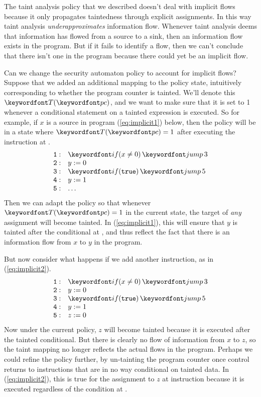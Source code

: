 \documentclass[11pt,twoside]{scrartcl}
\begin{document}
The taint analysis policy that we described doesn't deal with implicit flows because it only propagates taintedness through explicit assignments. In this way taint analysis \emph{underapproximates} information flow. Whenever taint analysis deems that information has flowed from a source to a sink, then an information flow exists in the program. But if it fails to identify a flow, then we can't conclude that there isn't one in the program because there could yet be an implicit flow.

Can we change the security automaton policy to account for implicit flows? Suppose that we added an additional mapping to the policy state, intuitively corresponding to whether the program counter is tainted. We'll denote this $\taint(\pc)$, and we want to make sure that it is set to 1 whenever a conditional statement on a tainted expression is executed. So for example, if $x$ is a source in program (\ref{eq:implicit1}) below, then the policy will be in a state where $\taint(\pc)=1$ after executing the instruction at .
\begin{equation}
\label{eq:implicit1}
\begin{array}{ll}
\mathtt{1:} & \pifjump{x \ne 0}{3} \\
\mathtt{2:} & y := 0 \\
\mathtt{3:} & \pifjump{\mathtt{true}}{5} \\
\mathtt{4:} & y := 1 \\
\mathtt{5:} & \ldots
\end{array}
\end{equation}
Then we can adapt the policy so that whenever $\taint(\pc) = 1$ in the current state, the target of \emph{any} assignment will become tainted. In (\ref{eq:implicit1}), this will ensure that $y$ is tainted after the conditional at , and thus reflect the fact that there is an information flow from $x$ to $y$ in the program.

But now consider what happens if we add another instruction, as in (\ref{eq:implicit2}).
\begin{equation}
\label{eq:implicit2}
\begin{array}{ll}
\mathtt{1:} & \pifjump{x \ne 0}{3} \\
\mathtt{2:} & y := 0 \\
\mathtt{3:} & \pifjump{\mathtt{true}}{5} \\
\mathtt{4:} & y := 1 \\
\mathtt{5:} & z := 0
\end{array}
\end{equation}
Now under the current policy, $z$ will become tainted because it is executed after the tainted conditional. But there is clearly no flow of information from $x$ to $z$, so the taint mapping no longer reflects the actual flows in the program. Perhaps we could refine the policy further, by un-tainting the program counter once control returns to instructions that are in no way conditional on tainted data. In (\ref{eq:implicit2}), this is true for the assignment to $z$ at instruction  because it is executed regardless of the condition at .
\end{document}

